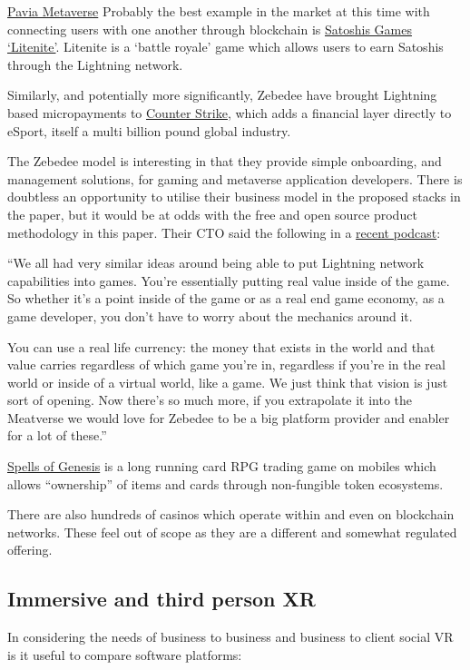 \href{https://www.thesun.co.uk/tech/17348918/pavia-metaverse-cardano-crypto-game/}{Pavia Metaverse}
Probably the best example in the market at this time with connecting users with one another through blockchain is \href{https://lightnite.io/}{Satoshis Games `Litenite'}. Litenite is a `battle royale' game which allows users to earn Satoshis through the Lightning network.\par
Similarly, and potentially more significantly, Zebedee have brought Lightning based micropayments to \href{https://zebedee.io/infuse/}{Counter Strike}, which adds a financial layer directly to eSport, itself a multi billion pound global industry.\par
The Zebedee model is interesting in that they provide simple onboarding, and management solutions, for gaming and metaverse application developers. There is doubtless an opportunity to utilise their business model in the proposed stacks in the paper, but it would be at odds with the free and open source product methodology in this paper. Their CTO said the following in a \href{https://lightningjunkies.net/lightning-address-making-lightning-user-friendly-lnj052/}{recent podcast}:\par
``We all had very similar ideas around being able to put Lightning network capabilities into games. You're essentially putting real value inside of the game. So whether it's a point inside of the game or as a real end game economy, as a game developer, you don't have to worry about the mechanics around it.\par
You can use a real life currency: the money that exists in the world and that value carries regardless of which game you're in, regardless if you're in the real world or inside of a virtual world, like a game. We just think that vision is just sort of opening. Now there's so much more, if you extrapolate it into the Meatverse we would love for Zebedee to be a big platform provider and enabler for a lot of these.''\par
\href{https://spellsofgenesis.com/}{Spells of Genesis} is a long running card RPG trading game on mobiles which allows ``ownership'' of items and cards through non-fungible token ecosystems.\par
There are also hundreds of casinos which operate within and even on blockchain networks. These feel out of scope as they are a different and somewhat regulated offering.

\subsection{Immersive and third person XR}
In considering the needs of business to business and business to client social VR is it useful to compare software platforms:
